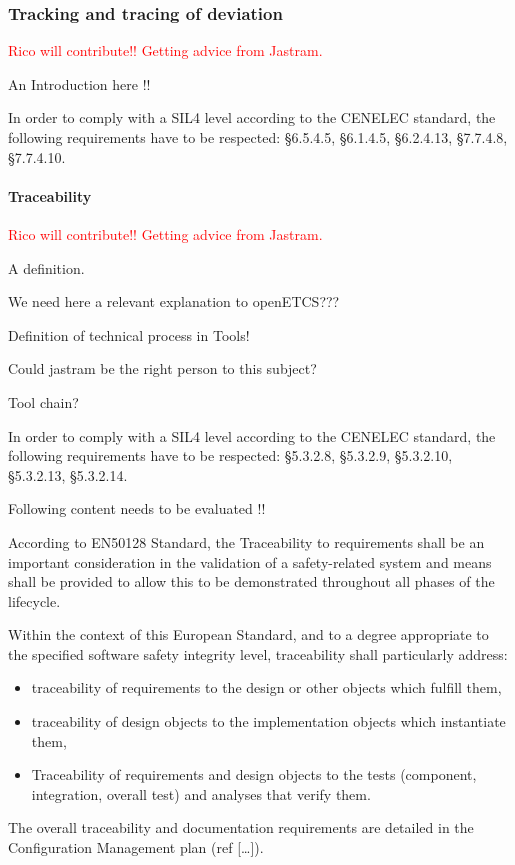 \documentclass{template/openetcs_article}
\begin{document}
\subsubsection{Tracking and tracing of deviation}
\textcolor{red}{Rico will contribute!! Getting advice from Jastram.}

An Introduction here !!

In order to comply with a SIL4 level according to the CENELEC standard, the following requirements have to be respected: {\S}6.5.4.5, {\S}6.1.4.5, {\S}6.2.4.13, {\S}7.7.4.8, {\S}7.7.4.10.


\paragraph{Traceability}
\textcolor{red}{Rico will contribute!! Getting advice from Jastram.}

A definition. 

We need here a relevant explanation to openETCS???

Definition of technical process in Tools! 

Could jastram be the right person to this subject?

Tool chain?

In order to comply with a SIL4 level according to the CENELEC standard, the following requirements have to be respected: {\S}5.3.2.8, {\S}5.3.2.9, {\S}5.3.2.10, {\S}5.3.2.13, {\S}5.3.2.14.

Following content needs to be evaluated !!

According to EN50128 Standard, the Traceability to requirements shall be an important consideration in the validation of a safety-related system and means shall be provided to allow this to be demonstrated throughout all phases of the lifecycle.

Within the context of this European Standard, and to a degree appropriate to the specified software safety integrity level, traceability shall particularly address:

\begin{itemize}
\item traceability of requirements to the design or other objects which fulfill them,
\item traceability of design objects to the implementation objects which instantiate them,
\item Traceability of requirements and design objects to the tests (component, integration, overall test) and analyses that verify them.
\end{itemize}
The overall traceability and documentation requirements are detailed in the Configuration Management plan (ref [{\dots}]).
\end{document}
